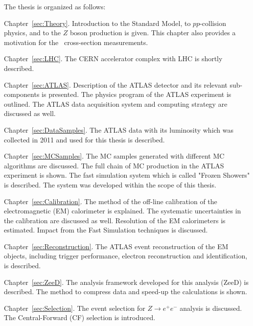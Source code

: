 The thesis is organized as follows:
\begin{description}
\item Chapter~\ref{sec:Theory}. Introduction to the Standard Model, to $pp$-collision physics, and to the $Z$ boson production is given. This chapter also provides a motivation for the \Zee\ cross-section measurements.

\item Chapter~\ref{sec:LHC}. The CERN accelerator complex with LHC is shortly described.

\item Chapter~\ref{sec:ATLAS}. Description of the ATLAS detector and its relevant sub-components is presented. The physics program of the ATLAS experiment is outlined. The ATLAS data acquisition system and computing strategy are discussed as well.

\item Chapter~\ref{sec:DataSamples}. The ATLAS data with its luminosity which was collected in 2011 and used for this thesis is described.

\item Chapter~\ref{sec:MCSamples}. The MC samples generated with different MC algorithms are discussed. The full chain of MC production in the ATLAS experiment is shown. The fast simulation system which is called "Frozen Showers" is described. The system was developed within the scope of this thesis.

\item Chapter~\ref{sec:Calibration}. The method of the off-line calibration of the electromagnetic (EM) calorimeter is explained. The systematic uncertainties in the calibration are discussed as well. Resolution of the EM calorimeters is estimated. Impact from the Fast Simulation techniques is discussed.

\item Chapter~\ref{sec:Reconstruction}. The ATLAS event reconstruction of the EM objects, including trigger performance, electron reconstruction and identification, is described.

\item Chapter~\ref{sec:ZeeD}. The analysis framework developed for this analysis (ZeeD) is described. The method to compress data and speed-up the calculations is shown.

\item Chapter~\ref{sec:Selection}. The event selection for $Z \to e^+e^-$ analysis is discussed. The Central-Forward (CF) selection is introduced.


\end{description}
